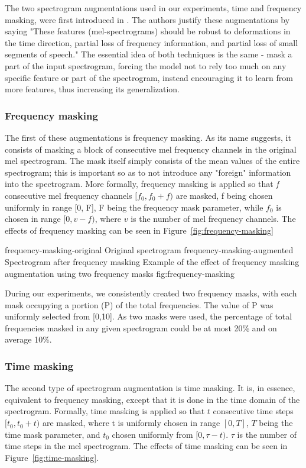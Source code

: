 The two spectrogram augmentations used in our experiments, time and frequency masking, were first introduced in \cite{specaugment}. The authors justify these augmentations by saying "These features (mel-spectrograms) should be robust to deformations in the time direction, partial loss of frequency information, and partial loss of small segments of speech." The essential idea of both techniques is the same - mask a part of the input spectrogram, forcing the model not to rely too much on any specific feature or part of the spectrogram, instead encouraging it to learn from more features, thus increasing its generalization.

\subsubsection{Frequency masking}

The first of these augmentations is frequency masking. As its name suggests, it consists of masking a block of consecutive mel frequency channels in the original mel spectrogram. The mask itself simply consists of the mean values of the entire spectrogram; this is important so as to not introduce any "foreign" information into the spectrogram. More formally, frequency masking is applied so that \textit{f} consecutive mel frequency channels $[f_0, f_0 + f)$ are masked, f being chosen uniformly in range [0, F], F being the frequency mask parameter, while $f_0$ is chosen in range $[0, v - f)$, where $v$ is the number of mel frequency channels. The effects of frequency masking can be seen in Figure~\ref{fig:frequency-masking}

\asideimages{7cm}{7cm}
	    {frequency-masking-original}
	    {Original spectrogram}
        {frequency-masking-augmented}
	    {Spectrogram after frequency masking}
	    {Example of the effect of frequency masking augmentation using two frequency masks}
	    {fig:frequency-masking}

During our experiments, we consistently created two frequency masks, with each mask occupying a portion (P) of the total frequencies. The value of P was uniformly selected from [0,10]. As two masks were used, the percentage of total frequencies masked in any given spectrogram could be at most 20\% and on average 10\%.

\subsubsection{Time masking}

The second type of spectrogram augmentation is time masking. It is, in essence, equivalent to frequency masking, except that it is done in the time domain of the spectrogram. Formally, time masking is applied so that $t$ consecutive time steps $[t_0, t_0 + t)$ are masked, where t is uniformly chosen in range $[0, T]$, $T$ being the time mask parameter, and $t_0$ chosen uniformly from $[0, \tau - t)$. $\tau$ is the number of time steps in the mel spectrogram. The effects of time masking can be seen in Figure~\ref{fig:time-masking}.

